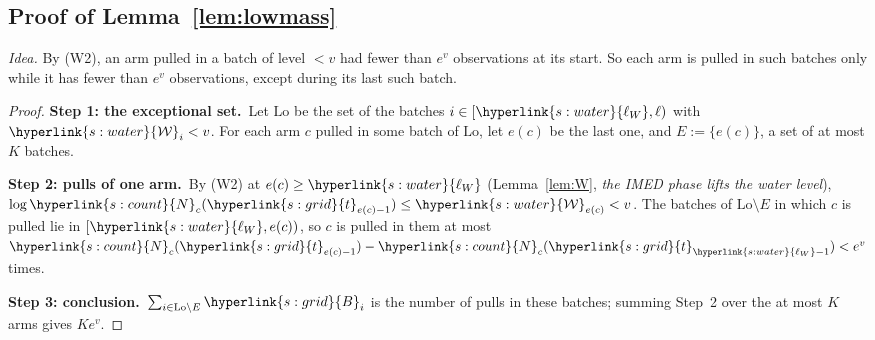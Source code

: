 \documentclass[10pt]{article}
\newcommand{\sy}[2]{{\hyperlink{#1}{#2}}}
\newcommand{\1}{\mathbf{1}}
\newcommand{\Ng}{\sy{s:count}{N}}
\newcommand{\tl}{\sy{s:grid}{t}}
\newcommand{\Bg}{\sy{s:grid}{B}}
\newcommand{\Lam}{\sy{s:water}{\mathcal W}}
\newcommand{\lW}{\sy{s:water}{\ell_W}}
\newcommand{\stp}[2]{\par\medskip\noindent\textbf{Step #1: #2.}\ }
\begin{document}
\subsection{Proof of Lemma~\ref{lem:lowmass}}\label{sec:pf-lem:lowmass}
\noindent\emph{Idea.} By (W2), an arm pulled in a batch of level $<v$ had fewer than $e^v$ observations at its start. So each arm is pulled in such batches only while it
has fewer than $e^v$ observations, except during its last such batch.

\begin{proof}
\stp1{the exceptional set}Let $\mathrm{Lo}$ be the set of the batches $i\in[\lW,\ell)$ with $\Lam_i<v$. For each arm $c$ pulled in some batch of $\mathrm{Lo}$, let $e(c)$ be the
last one, and $E:=\{e(c)\}$, a set of at most $K$ batches.

\stp2{pulls of one arm}By (W2) at $e(c)\ge\lW$ (Lemma~\ref{lem:W}, \emph{the IMED phase lifts the water level}), $\log\Ng_c(\tl_{e(c)-1})\le\Lam_{e(c)}<v$. The batches of $\mathrm{Lo}\setminus E$ in which $c$ is pulled lie in
$[\lW,e(c))$, so $c$ is pulled in them at most $\Ng_c(\tl_{e(c)-1})-\Ng_c(\tl_{\lW-1})<e^v$ times.

\stp3{conclusion}$\sum_{i\in\mathrm{Lo}\setminus E}\Bg_i$ is the number of pulls in these batches; summing Step~2 over the at most $K$ arms gives $Ke^v$.
\end{proof}

\end{document}
